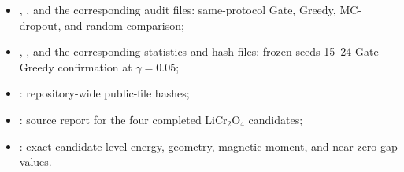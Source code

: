 \documentclass[cmc,article,submit,moreauthors,pdftex]{Definitions/tsp}
\begin{document}
\begin{itemize}
\item {},
, and the corresponding audit
files: same-protocol Gate, Greedy, MC-dropout, and random comparison;
\item {},
, and the
corresponding statistics and hash files: frozen seeds 15--24 Gate--Greedy
confirmation at $\gamma=0.05$;
\item {}: repository-wide public-file hashes;
\item {}: source report for the four
completed LiCr$_2$O$_4$ candidates;
\item {}: exact candidate-level energy,
geometry, magnetic-moment, and near-zero-gap values.
\end{itemize}
\end{document}

